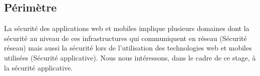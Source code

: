 \subsection{Périmètre}
La sécurité des applications web et mobiles implique plusieurs domaines dont la sécurité au niveau de ces infrastructures qui communiquent en réseau (Sécurité réseau) mais aussi la sécurité lors de l’utilisation des technologies web et mobiles utilisées (Sécurité applicative). Nous nous intéressons, dans le cadre de ce stage, à la sécurité applicative.

